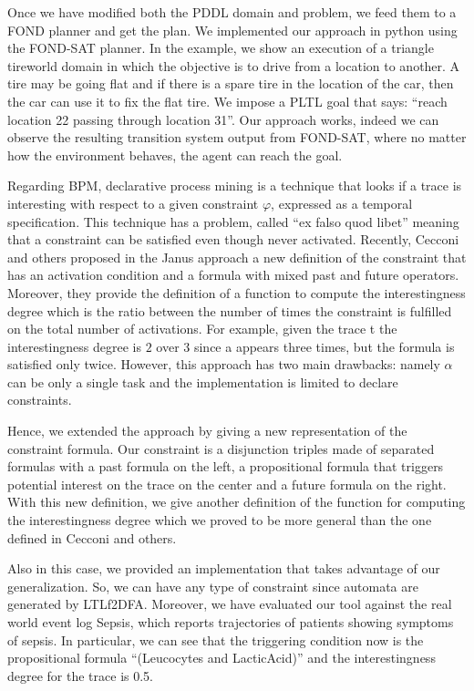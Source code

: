 \documentclass[]{article}
\begin{document}
\bigskip
Once we have modified both the PDDL domain and problem, we feed them to a FOND planner and get the plan. We implemented our approach in python using the FOND-SAT planner. In the example, we show an execution of a triangle tireworld domain in which the objective is to drive from a location to another. A tire may be going flat and if there is a spare tire in the location of the car, then the car can use it to fix the flat tire. We impose a PLTL goal that says: ``reach location 22 passing through location 31''. Our approach works, indeed we can observe the resulting transition system output from FOND-SAT, where no matter how the environment behaves, the agent can reach the goal.

\bigskip
Regarding BPM, declarative process mining is a technique that looks if a trace is interesting with respect to a given constraint $\varphi$, expressed as a temporal specification. This technique has  a problem, called ``ex falso quod libet'' meaning that a constraint can be satisfied even though never activated. Recently, Cecconi and others proposed in the Janus approach a new definition of the constraint that has an activation condition and a formula with mixed past and future operators. Moreover, they provide the definition of a function to compute the interestingness degree which is the ratio between the number of times the constraint is fulfilled on the total number of activations. For example, given the trace t the interestingness degree is $2$ over $3$ since a appears three times, but the formula is satisfied only twice. However, this approach has two main drawbacks: namely $\alpha$ can be only a single task and the implementation is limited to declare constraints.

\bigskip
Hence, we extended the approach by giving a new representation of the constraint formula. Our constraint is a disjunction triples made of separated formulas with a past formula on the left, a propositional formula that triggers potential interest on the trace on the center and a future formula on the right. With this new definition, we give another definition of the function for computing the interestingness degree which we proved to be more general than the one defined in Cecconi and others.

\bigskip
Also in this case, we provided an implementation that takes advantage of our generalization. So, we can have any type of constraint since automata are generated by LTLf2DFA. Moreover, we have evaluated our tool against the real world event log Sepsis, which reports trajectories of patients showing symptoms of sepsis. In particular, we can see that the triggering condition now is the propositional formula ``(Leucocytes and LacticAcid)'' and the interestingness degree for the trace is 0.5.
\end{document}

